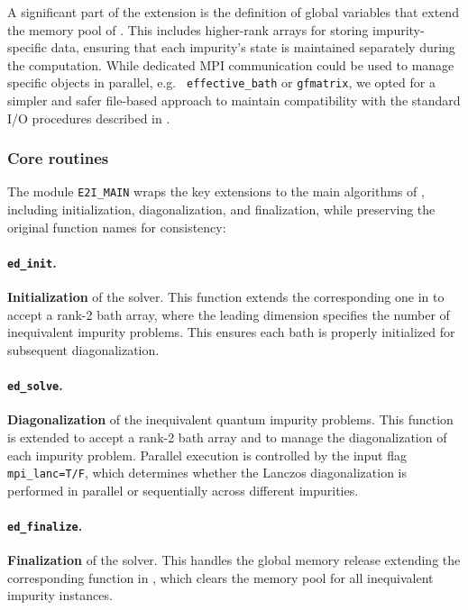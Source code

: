 \documentclass[edipack_sp.tex]{subfiles}
\begin{document}
A significant part of the  extension is the 
definition of global variables that extend the memory pool of 
\NAME. This includes higher-rank arrays for storing impurity-specific 
data, ensuring that each impurity's state is maintained separately 
during the computation. While dedicated MPI communication could be 
used to manage specific objects in parallel, e.g. {\tt
  effective\_bath} or {\tt gfmatrix}, we opted for a simpler and safer  
file-based approach to maintain compatibility with the standard I/O 
procedures described in .


\subsubsection{Core routines}\label{ssSecIneqGlobal}
The module {\tt E2I\_MAIN} wraps the key extensions to the main 
algorithms of \NAME, including initialization, diagonalization, and 
finalization, while preserving the original function names for consistency: 

\paragraph{{\tt ed\_init}.} {\bf Initialization} of the solver. This function  extends the corresponding one in \NAME  to 
  accept a rank-2 bath array, where the leading dimension specifies 
  the number of inequivalent impurity problems. This ensures each bath 
  is properly initialized for subsequent diagonalization.

\paragraph{{\tt ed\_solve}.} {\bf Diagonalization} of the inequivalent quantum impurity problems. This function is extended to  accept a  
  rank-2 bath array and to manage the diagonalization of each impurity 
  problem. Parallel execution is controlled by the input flag 
  {\tt mpi\_lanc=T/F}, which determines whether the Lanczos 
  diagonalization is performed in parallel or sequentially across 
  different impurities.

\paragraph{{\tt ed\_finalize}.} {\bf Finalization} of the solver. This handles the global memory release extending the corresponding  function in \NAME, which clears the memory pool for all inequivalent impurity instances.
\end{document}
